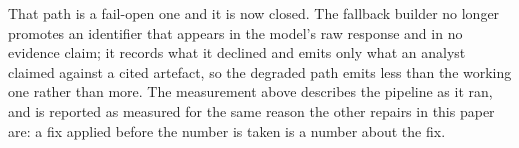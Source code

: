 That path is a fail-open one and it is now closed. The fallback builder no longer promotes an identifier
that appears in the model's raw response and in no evidence claim; it records what it declined and
emits only what an analyst claimed against a cited artefact, so the degraded path emits less than
the working one rather than more. The measurement above describes the pipeline as it ran, and is
reported as measured for the same reason the other repairs in this paper are: a fix applied before
the number is taken is a number about the fix.
